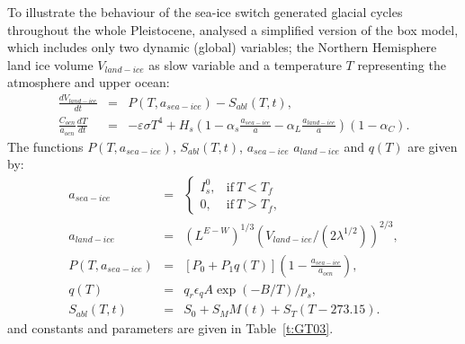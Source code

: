 \documentclass[12pt]{article}
\def\ba{\begin{eqnarray}}
\def\ea{\end{eqnarray}}
\begin{document}
To illustrate the behaviour of the sea-ice switch generated glacial cycles throughout the whole Pleistocene, \cite{Tziperman2003} analysed a simplified version of the box model, which includes only two dynamic (global) variables; the Northern Hemisphere land ice volume $V_{land-ice}$ as slow variable and a temperature $T$ representing the atmosphere and upper ocean: 
\ba
\frac{d V_{land-ice}}{dt} &=& P(T, a_{sea-ice}) - S_{abl}(T,t),\\
\frac{C_{ocn}}{a_{ocn}}\frac{d T}{dt} &=& -\varepsilon\sigma T^4 + H_s\left(1-\alpha_s\frac{a_{sea-ice}}{a}-\alpha_L\frac{a_{land-ice}}{a}\right)\left(1-\alpha_C\right).
\label{e:GT03}
\ea
The functions $P(T,a_{sea-ice})$, $S_{abl}(T,t)$, $a_{sea-ice}$ $a_{land-ice}$ and $q(T)$ are given by:
\ba
a_{sea-ice} &=& 
    \begin{cases}
      I_s^0, & \text{if}\ T<T_f \\
      0, & \text{if}\ T>T_f,
    \end{cases}
\\
a_{land-ice} &=&  \left(L^{E-W}\right)^{1/3}\left(V_{land-ice}/\left(2\lambda^{1/2}\right)\right)^{2/3},\\
P(T,a_{sea-ice} )&=&\left[P_0+P_1q(T)\right]\left(1-\frac{a_{sea-ice}}{a_{ocn}}\right),
\\
q(T) &=& q_r \epsilon_q A \exp{(-B/T)}/p_s,
\\
S_{abl}(T,t) &=& S_0 +S_M M(t) + S_T(T-273.15).
\ea
and constants and parameters are given in Table~\ref{t:GT03}.
\end{document}
